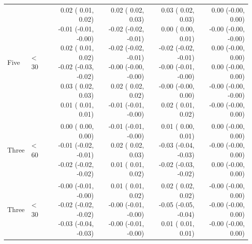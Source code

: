 \documentclass[12pt,PhD,twoside,openright]{muthesis}
\begin{document}
\begin{table}[!h]
\begin{tabular}[t]{>{}l>{}l>{\ttfamily}r>{\ttfamily}r>{\ttfamily}r>{\ttfamily}r}
\hspace{1em}Five & < 30 & \makecell[r]{0.02 ( 0.01,  0.02)\\ -0.01 (-0.01, -0.00)\\  0.02 ( 0.01,  0.02)\\ -0.02 (-0.03, -0.02)\\  0.03 ( 0.02,  0.03)\\  0.01 ( 0.01,  0.01)} & \makecell[r]{0.02 ( 0.02,  0.03)\\ -0.02 (-0.02, -0.01)\\ -0.02 (-0.02, -0.01)\\ -0.00 (-0.00, -0.00)\\  0.02 ( 0.02,  0.02)\\ -0.01 (-0.01, -0.00)} & \makecell[r]{0.03 ( 0.02,  0.03)\\  0.00 ( 0.00,  0.01)\\ -0.02 (-0.02, -0.01)\\ -0.00 (-0.01, -0.00)\\ -0.00 (-0.00,  0.00)\\  0.02 ( 0.01,  0.02)} & \makecell[r]{0.00 (-0.00,  0.00)\\ -0.00 (-0.00, -0.00)\\  0.00 (-0.00,  0.00)\\  0.00 (-0.00,  0.00)\\ -0.00 (-0.00, -0.00)\\ -0.00 (-0.00,  0.00)}\\
\rowcolor{gray!6}  \hspace{1em}Three & < 60 & \makecell[r]{0.00 ( 0.00,  0.00)\\ -0.01 (-0.02, -0.01)\\ -0.02 (-0.02, -0.02)} & \makecell[r]{-0.01 (-0.01, -0.00)\\  0.02 ( 0.02,  0.03)\\  0.01 ( 0.01,  0.02)} & \makecell[r]{0.01 ( 0.00,  0.01)\\ -0.03 (-0.04, -0.03)\\ -0.02 (-0.03, -0.02)} & \makecell[r]{0.00 (-0.00,  0.00)\\ -0.00 (-0.00,  0.00)\\  0.00 (-0.00,  0.00)}\\
\hspace{1em}Three & < 30 & \makecell[r]{-0.00 (-0.01, -0.00)\\ -0.02 (-0.02, -0.02)\\ -0.03 (-0.04, -0.03)} & \makecell[r]{0.01 ( 0.01,  0.02)\\ -0.00 (-0.01, -0.00)\\ -0.00 (-0.01, -0.00)} & \makecell[r]{0.02 ( 0.02,  0.02)\\ -0.05 (-0.05, -0.04)\\  0.01 ( 0.01,  0.01)} & \makecell[r]{-0.00 (-0.00,  0.00)\\ -0.00 (-0.00,  0.00)\\ -0.00 (-0.00,  0.00)}\\

\end{tabular}
\end{table}
\end{document}
